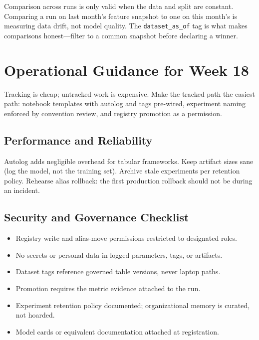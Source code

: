 \begin{pitfall}
Comparison across runs is only valid when the data and split are constant. Comparing a run on last month's feature snapshot to one on this month's is measuring data drift, not model quality. The \texttt{dataset\_as\_of} tag is what makes comparisons honest---filter to a common snapshot before declaring a winner.
\end{pitfall}

\section{Operational Guidance for Week 18}
Tracking is cheap; untracked work is expensive. Make the tracked path the easiest path: notebook templates with autolog and tags pre-wired, experiment naming enforced by convention review, and registry promotion as a permission.

\subsection{Performance and Reliability}
Autolog adds negligible overhead for tabular frameworks. Keep artifact sizes sane (log the model, not the training set). Archive stale experiments per retention policy. Rehearse alias rollback: the first production rollback should not be during an incident.

\subsection{Security and Governance Checklist}
\begin{itemize}
    \item Registry write and alias-move permissions restricted to designated roles.
    \item No secrets or personal data in logged parameters, tags, or artifacts.
    \item Dataset tags reference governed table versions, never laptop paths.
    \item Promotion requires the metric evidence attached to the run.
    \item Experiment retention policy documented; organizational memory is curated, not hoarded.
    \item Model cards or equivalent documentation attached at registration.
\end{itemize}

